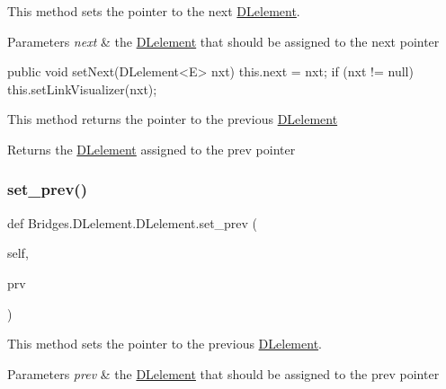 This method sets the pointer to the next \mbox{\hyperlink{class_bridges_1_1_d_lelement_1_1_d_lelement}{D\+Lelement}}. 


\begin{DoxyParams}{Parameters}
{\em next} & the \mbox{\hyperlink{class_bridges_1_1_d_lelement_1_1_d_lelement}{D\+Lelement}} that should be assigned to the next pointer\\
\hline
\end{DoxyParams}
\begin{DoxyVerb}    public void setNext(DLelement<E> nxt) {
        this.next = nxt;
        if (nxt != null)
            this.setLinkVisualizer(nxt);
    }
\end{DoxyVerb}


This method returns the pointer to the previous \mbox{\hyperlink{class_bridges_1_1_d_lelement_1_1_d_lelement}{D\+Lelement}}

\begin{DoxyReturn}{Returns}
the \mbox{\hyperlink{class_bridges_1_1_d_lelement_1_1_d_lelement}{D\+Lelement}} assigned to the prev pointer 
\end{DoxyReturn}
\mbox{\label{class_bridges_1_1_d_lelement_1_1_d_lelement_a34acbe81af0c0c90640383363fe0aadc}} 
\subsubsection{\texorpdfstring{set\+\_\+prev()}{set\_prev()}}
{\footnotesize\ttfamily def Bridges.\+D\+Lelement.\+D\+Lelement.\+set\+\_\+prev (\begin{DoxyParamCaption}\item[{}]{self,  }\item[{}]{prv }\end{DoxyParamCaption})}



This method sets the pointer to the previous \mbox{\hyperlink{class_bridges_1_1_d_lelement_1_1_d_lelement}{D\+Lelement}}. 


\begin{DoxyParams}{Parameters}
{\em prev} & the \mbox{\hyperlink{class_bridges_1_1_d_lelement_1_1_d_lelement}{D\+Lelement}} that should be assigned to the prev pointer \\
\hline
\end{DoxyParams}


